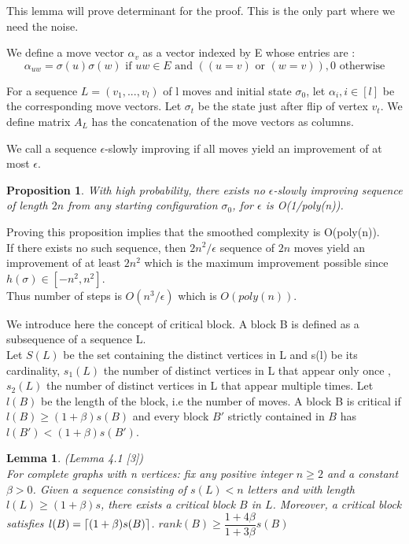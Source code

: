 \documentclass[12pt]{article}
\newtheorem{lemma}[theorem]{Lemma}
\newtheorem{proposition}[theorem]{Proposition}
\DeclarePairedDelimiter{\ceil}{\lceil}{\rceil}
\begin{document}
This lemma will prove determinant for the proof. This is the only part where we need the noise.

We define a move vector $\alpha_v$ as a vector indexed by E whose entries are :
\begin{equation*}
\alpha_{uw} = \sigma(u)\sigma(w) \text{ if } uw \in E \text{ and }( (u = v) \text{ or } (w = v)), 0 \text{ otherwise}
\end{equation*} 

For a sequence $L = (v_1, ..., v_l)$ of l moves and initial state $\sigma_0$, let $\alpha_i, i \in [l]$ be the corresponding move vectors. Let $\sigma_t$ be the state just after flip of vertex $v_t$. We define matrix $A_L$ has the concatenation of the move vectors as columns.

We call a sequence $\epsilon$-slowly improving if all moves yield an improvement of at most $\epsilon$.

\begin{proposition}
\label{prop}
With high probability, there exists no $\epsilon$-slowly improving sequence of length $2n$ from any starting configuration $\sigma_0$, for $\epsilon$ is O(1/poly(n)).
\end{proposition}

Proving this proposition implies that the smoothed complexity is O(poly(n)). \\
If there exists no such sequence, then $2n^2/\epsilon$ sequence of $2n$ moves yield an improvement of at least $2n^2$ which is the maximum improvement possible since $h(\sigma) \in [-n^2,n^2]$. \\
Thus number of steps is $O(n^3/\epsilon)$ which is $O(poly(n))$.

We introduce here the concept of critical block. A block B is defined as a subsequence of a sequence L.\\
Let $S(L)$ be the set containing the distinct vertices in L and s(l) be its cardinality, $s_1(L)$ the number of distinct vertices in L that appear only once , $s_2(L)$ the number of distinct vertices in L that appear multiple times. Let $l(B)$ be the length of the block, i.e the number of moves.
A block B is critical if $l(B) \geq (1 + \beta)s(B)$ and every block $B'$ strictly contained in $B$ has $l(B') < (1+\beta)s(B')$.

\begin{lemma}
\label{critical}
(Lemma 4.1 [3]) \\
For complete graphs with n vertices: fix any positive integer $n \geq 2$ and a constant $\beta > 0$. Given a sequence consisting of $s(L) < n$ letters and with length $l(L) \geq (1 +\beta)s$, there exists a critical block $B$ in $L$. Moreover, a critical block satisfies $l(B) = \ceil{(1 + \beta)s(B)}$.
$rank(B) \geq \dfrac{1+4\beta}{1 + 3\beta}s(B)$
\end{lemma} 
\end{document}
